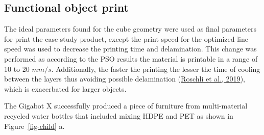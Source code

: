 \documentclass[
  12pt,
]{article}
\begin{document}
\hypertarget{functional-object-print}{%
\subsection{Functional object print}\label{functional-object-print}}

The ideal parameters found for the cube geometry were used as final
parameters for print the case study product, except the print speed for
the optimized line speed was used to decrease the printing time and
delamination. This change was performed as according to the PSO results
the material is printable in a range of 10 to 20 \(mm/s\). Additionally,
the faster the printing the lesser the time of cooling between the
layers thus avoiding possible delamination
(\protect\hyperlink{ref-roschli2019}{Roschli et al., 2019}), which is
exacerbated for larger objects.

The Gigabot X successfully produced a piece of furniture from
multi-material recycled water bottles that included mixing HDPE and PET
as shown in Figure~\ref{fig-child} a.
\end{document}
